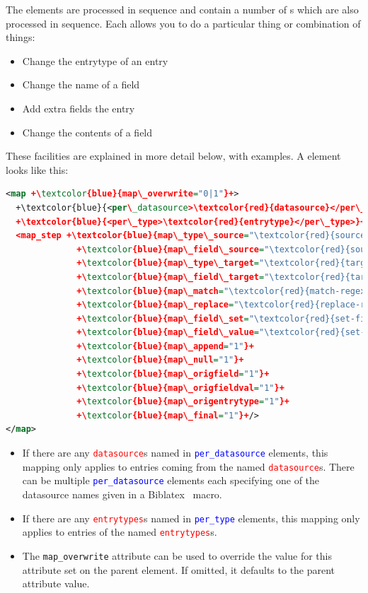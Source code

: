 \documentclass{ltxdockit}
\newcommand*{\biblatex}{Biblatex\xspace}
\begin{document}
The  elements are processed in sequence and contain a number of
s which are also processed in sequence. Each 
allows you to do a particular thing or combination of things:

\begin{itemize}
\item Change the entrytype of an entry
\item Change the name of a field
\item Add extra fields the entry
\item Change the contents of a field
\end{itemize}

\noindent These facilities are explained in more detail below, with
examples. A  element looks like this:

\begin{lstlisting}[language=xml,escapechar=+,mathescape=true]
<map +\textcolor{blue}{map\_overwrite="0|1"}+>
  +\textcolor{blue}{<per\_datasource>\textcolor{red}{datasource}</per\_datasource>}+
  +\textcolor{blue}{<per\_type>\textcolor{red}{entrytype}</per\_type>}+
  <map_step +\textcolor{blue}{map\_type\_source="\textcolor{red}{source-entrytype}"}+
              +\textcolor{blue}{map\_field\_source="\textcolor{red}{source-field}"}+
              +\textcolor{blue}{map\_type\_target="\textcolor{red}{target-entrytype}"}+
              +\textcolor{blue}{map\_field\_target="\textcolor{red}{target-field}"}+
              +\textcolor{blue}{map\_match="\textcolor{red}{match-regexp}"}+
              +\textcolor{blue}{map\_replace="\textcolor{red}{replace-regexp}"}+
              +\textcolor{blue}{map\_field\_set="\textcolor{red}{set-field}"}+
              +\textcolor{blue}{map\_field\_value="\textcolor{red}{set-value}"}+
              +\textcolor{blue}{map\_append="1"}+
              +\textcolor{blue}{map\_null="1"}+
              +\textcolor{blue}{map\_origfield="1"}+
              +\textcolor{blue}{map\_origfieldval="1"}+
              +\textcolor{blue}{map\_origentrytype="1"}+
              +\textcolor{blue}{map\_final="1"}+/>
</map>
\end{lstlisting}

\begin{itemize}
\item If there are any \textcolor{red}{\texttt{datasource}}s named in
  \textcolor{blue}{\texttt{per\_datasource}} elements, this mapping only applies to entries
  coming from the named \textcolor{red}{\texttt{datasource}}s. There can be
  multiple \textcolor{blue}{\texttt{per\_datasource}} elements each specifying one of the
  datasource names given in a \biblatex\ \verb++ macro.
\item If there are any \textcolor{red}{\texttt{entrytypes}}s named in
  \textcolor{blue}{\texttt{per\_type}} elements, this mapping only applies to entries
  of the named \textcolor{red}{\texttt{entrytypes}}s.
\item The \texttt{map\_overwrite} attribute can be used to override the
  value for this attribute set on the parent  element. If
  omitted, it defaults to the parent  attribute value.
\end{itemize}
\end{document}
